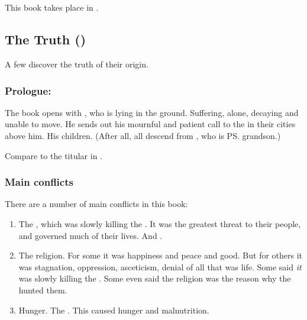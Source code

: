 \chapter{\MerkyrahBook}
This book takes place in . 















\section{The Truth ()}
A few \resphain{} discover the truth of their origin.









\subsection[Prologue: Semiza]{Prologue: \Semiza}
The book opens with \Semiza, who is lying in the ground. 
Suffering, alone, decaying and unable to move. 
He sends out his mournful and patient call to the \resphain{} in their cities above him. 
His children. 
(After all, all \resphain{} descend from \Thanatzil, who is \ps{\Semiza}{} grandson.)

Compare to the titular  in . 









\subsection{Main conflicts}
There are a number of main conflicts in this book: 

\begin{enumerate}
  \item 
    The , which was slowly killing the \resphain. 
    It was the greatest threat to their people, and governed much of their lives. 
    And . 
  \item 
    The \Merkyran{} religion.
    For some it was happiness and peace and good. 
    But for others it was stagnation, oppression, asceticism, denial of all that was life. 
    Some said \emph{it} was slowly killing the \resphain.
    Some even said the religion was the reason why the \umbrae{} hunted them. 
  \item 
    Hunger. 
    The . 
    This caused hunger and malnutrition. 
\end{enumerate}





